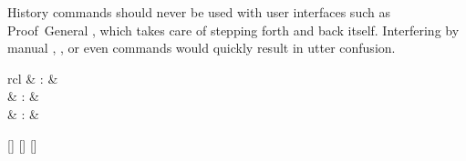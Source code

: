 \begin{isabellebody}
\begin{isamarkuptext}
  \begin{warn}
    History commands should never be used with user interfaces such as
    Proof~General \cite{proofgeneral,Aspinall:TACAS:2000}, which takes
    care of stepping forth and back itself.  Interfering by manual
    \hyperlink{command.undo}{\mbox{}}, \hyperlink{command.linear-undo}{\mbox{}}, or even \hyperlink{command.kill}{\mbox{}} commands would quickly result in utter confusion.
  \end{warn}%
\end{isamarkuptext}%
\isamarkuptrue%
%
\isamarkuptrue%
%
\begin{isamarkuptext}%
\begin{matharray}{rcl}
    \hypertarget{command.cd}{\hyperlink{command.cd}{\mbox{}}} & : &  \\
    \hypertarget{command.pwd}{\hyperlink{command.pwd}{\mbox{}}} & : &  \\
    \hypertarget{command.use-thy}{\hyperlink{command.use-thy}{\mbox{}}} & : &  \\
  \end{matharray}

  \begin{railoutput}
\rail@bar
{}[]
[]
\rail@endbar
{}[]
\rail@end
\end{railoutput}



\end{isamarkuptext}
\end{isabellebody}

